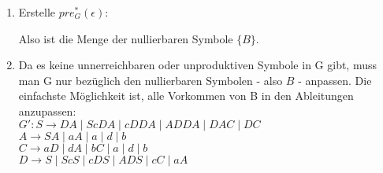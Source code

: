\documentclass[11pt]{article}
\begin{document}
\begin{enumerate}[label=\alph*)]
\item Erstelle $pre^{*}_{G}(\epsilon)$:
\begin{center}
\end{center}
\begin{center}
\end{center}
Also ist die Menge der nullierbaren Symbole $\{B\}$.
\item Da es keine unnerreichbaren oder unproduktiven Symbole in G gibt, muss man G nur bezüglich den nullierbaren Symbolen - also $B$ - anpassen. Die einfachste Möglichkeit ist, alle Vorkommen von B in den Ableitungen anzupassen:\\
$G': S\rightarrow DA \mid ScDA \mid cDDA \mid ADDA \mid DAC \mid DC$
\\\hspace*{6mm} $A\rightarrow SA \mid aA \mid a \mid d \mid b$
\\\hspace*{6mm} $C\rightarrow aD \mid dA \mid bC \mid a \mid d \mid b$
\\\hspace*{6mm} $D\rightarrow S \mid ScS \mid cDS \mid ADS \mid cC \mid aA$
\end{enumerate}


%
%
\end{document}
